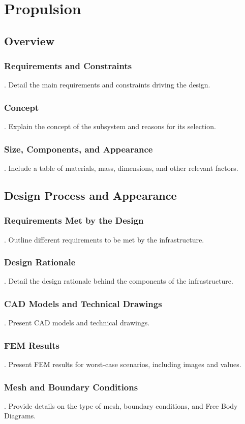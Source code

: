 \section{Propulsion}
\subsection{Overview}
\subsubsection{Requirements and Constraints}
.  Detail the main requirements and constraints driving the design.
\subsubsection{Concept}
.  Explain the concept of the subsystem and reasons for its selection.
\subsubsection{Size, Components, and Appearance}
.  Include a table of materials, mass, dimensions, and other relevant factors.

\subsection{Design Process and Appearance}
\subsubsection{Requirements Met by the Design}
.  Outline different requirements to be met by the infrastructure.
\subsubsection{Design Rationale}
.  Detail the design rationale behind the components of the infrastructure.
\subsubsection{CAD Models and Technical Drawings}
.  Present CAD models and technical drawings.
\subsubsection{FEM Results}
.  Present FEM results for worst-case scenarios, including images and values.
\subsubsection{Mesh and Boundary Conditions}
.  Provide details on the type of mesh, boundary conditions, and Free Body Diagrams.
